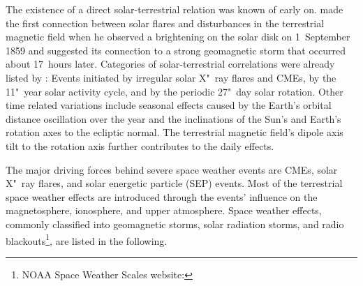 The existence of a direct solar-terrestrial relation was known of early on. \citet{Carrington1859} made the first connection between solar flares and disturbances in the terrestrial magnetic field when he observed a brightening on the solar disk on 1~September 1859 and suggested its connection to a strong geomagnetic storm that occurred about 17~hours later. Categories of solar-terrestrial correlations were already listed by \citet{Bartels1962}: Events initiated by irregular solar X"~ray flares and CMEs, by the 11"~year solar activity cycle, and by the periodic 27"~day solar rotation. Other time related variations include seasonal effects caused by the Earth's orbital distance oscillation over the year and the inclinations of the Sun's and Earth's rotation axes to the ecliptic normal. The terrestrial magnetic field's dipole axis tilt to the rotation axis further contributes to the daily effects.

The major driving forces behind severe space weather events are CMEs, solar X"~ray flares, and solar energetic particle (SEP) events. Most of the terrestrial space weather effects are introduced through the events' influence on the magnetosphere, ionosphere, and upper atmosphere. Space weather effects, commonly classified into geomagnetic storms, solar radiation storms, and radio blackouts\footnote{NOAA Space Weather Scales website: }, are listed in the following.

